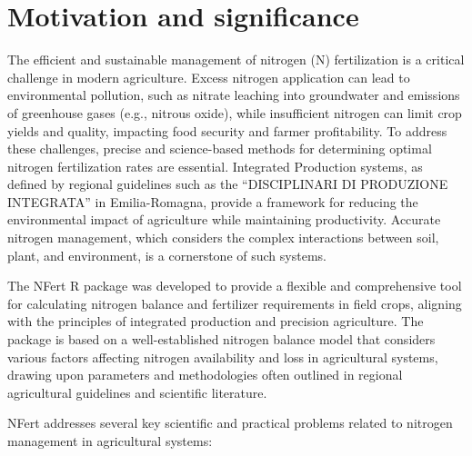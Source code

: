 \documentclass[
  11pt,
]{article}
\begin{document}
\section{Motivation and significance}\label{motivation-and-significance}

The efficient and sustainable management of nitrogen (N) fertilization
is a critical challenge in modern agriculture. Excess nitrogen
application can lead to environmental pollution, such as nitrate
leaching into groundwater and emissions of greenhouse gases (e.g.,
nitrous oxide), while insufficient nitrogen can limit crop yields and
quality, impacting food security and farmer profitability. To address
these challenges, precise and science-based methods for determining
optimal nitrogen fertilization rates are essential. Integrated
Production systems, as defined by regional guidelines such as the
``DISCIPLINARI DI PRODUZIONE INTEGRATA'' in Emilia-Romagna, provide a
framework for reducing the environmental impact of agriculture while
maintaining productivity. Accurate nitrogen management, which considers
the complex interactions between soil, plant, and environment, is a
cornerstone of such systems.

The NFert R package was developed to provide a flexible and
comprehensive tool for calculating nitrogen balance and fertilizer
requirements in field crops, aligning with the principles of integrated
production and precision agriculture. The package is based on a
well-established nitrogen balance model that considers various factors
affecting nitrogen availability and loss in agricultural systems,
drawing upon parameters and methodologies often outlined in regional
agricultural guidelines and scientific literature.

NFert addresses several key scientific and practical problems related to
nitrogen management in agricultural systems:
\end{document}
